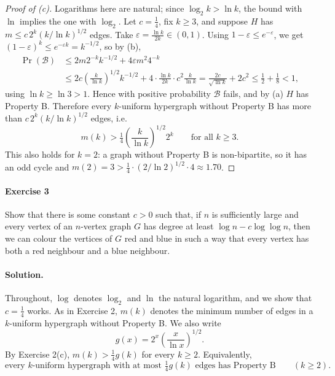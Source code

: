 \documentclass[a4paper,12pt]{article}
\newcommand{\eps}{\varepsilon}
\begin{document}
\begin{proof}[Proof of (c)]
	Logarithms here are natural; since $\log_2 k > \ln k$, the bound with $\ln$ implies the one with $\log_2$. Let $c = \frac14$, fix $k \ge 3$, and suppose $H$ has $m \le c\, 2^k (k / \ln k)^{1/2}$ edges. Take $\eps = \frac{\ln k}{2k} \in (0,1)$. Using $1 - \eps \le e^{-\eps}$, we get $(1-\eps)^k \le e^{-\eps k} = k^{-1/2}$, so by (b),
	\begin{align*}
		\Pr(\mathcal{B}) &\le 2 m 2^{-k} k^{-1/2} + 4 \eps m^2 4^{-k} \\
		&\le 2c \left( \frac{k}{\ln k} \right)^{1/2} k^{-1/2} + 4 \cdot \frac{\ln k}{2k} \cdot c^2 \frac{k}{\ln k} = \frac{2c}{\sqrt{\ln k}} + 2c^2 \le \frac12 + \frac18 < 1,
	\end{align*}
	using $\ln k \ge \ln 3 > 1$. Hence with positive probability $\mathcal{B}$ fails, and by (a) $H$ has Property B. Therefore every $k$-uniform hypergraph without Property B has more than $c\, 2^k (k/\ln k)^{1/2}$ edges, i.e.
	\[
		m(k) > \tfrac14 \left( \frac{k}{\ln k} \right)^{1/2} 2^k \qquad \text{for all } k \ge 3.
	\]
	This also holds for $k = 2$: a graph without Property B is non-bipartite, so it has an odd cycle and $m(2) = 3 > \frac14 \cdot (2/\ln 2)^{1/2} \cdot 4 \approx 1.70$.
\end{proof}

\paragraph{Exercise 3}  Show that there is some constant $c > 0$ such that, if $n$ is sufficiently large and every vertex of an $n$-vertex graph $G$ has degree at least $\log n - c \log \log n$, then we can colour the vertices of $G$ red and blue in such a way that every vertex has both a red neighbour and a blue neighbour.

\paragraph{Solution.} Throughout, $\log$ denotes $\log_2$ and $\ln$ the natural logarithm, and we show that $c = \frac14$ works. As in Exercise 2, $m(k)$ denotes the minimum number of edges in a $k$-uniform hypergraph without Property B. We also write
\[
	g(x) = 2^x \left( \frac{x}{\ln x} \right)^{1/2}.
\]
By Exercise 2(c), $m(k) > \frac14 g(k)$ for every $k \ge 2$. Equivalently,
\begin{equation}\label{eq:mk}
	\text{every $k$-uniform hypergraph with at most $\tfrac14 g(k)$ edges has Property B} \qquad (k \ge 2).
\end{equation}
\end{document}
